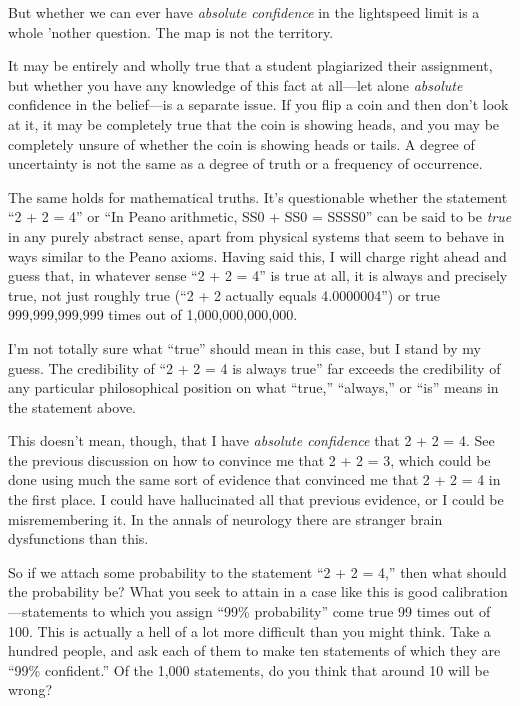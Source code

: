 {
 But whether we can ever have \textit{absolute confidence} in the
lightspeed limit is a whole 'nother question. The map
is not the territory.}

{
 It may be entirely and wholly true that a student plagiarized
their assignment, but whether you have any knowledge of this fact at
all---let alone \textit{absolute} confidence in the belief---is a
separate issue. If you flip a coin and then don't look
at it, it may be completely true that the coin is showing heads, and
you may be completely unsure of whether the coin is showing heads or
tails. A degree of uncertainty is not the same as a degree of truth or
a frequency of occurrence.}

{
 The same holds for mathematical truths. It's
questionable whether the statement ``2 + 2 =
4'' or ``In Peano arithmetic, SS0 +
SS0 = SSSS0'' can be said to be \textit{true} in any
purely abstract sense, apart from physical systems that seem to behave
in ways similar to the Peano axioms. Having said this, I will charge
right ahead and guess that, in whatever sense ``2 + 2
= 4'' is true at all, it is always and precisely
true, not just roughly true (``2 + 2 actually equals
4.0000004'') or true 999,999,999,999 times out of
1,000,000,000,000.}

{
 I'm not totally sure what
``true'' should mean in this case,
but I stand by my guess. The credibility of ``2 + 2 =
4 is always true'' far exceeds the credibility of any
particular philosophical position on what
``true,''
``always,'' or
``is'' means in the statement
above.}

{
 This doesn't mean, though, that I have
\textit{absolute confidence} that 2 + 2 = 4. See the previous
discussion on how to convince me that 2 + 2 = 3, which could be done
using much the same sort of evidence that convinced me that 2 + 2 = 4
in the first place. I could have hallucinated all that previous
evidence, or I could be misremembering it. In the annals of neurology
there are stranger brain dysfunctions than this.}

{
 So if we attach some probability to the statement
``2 + 2 = 4,'' then what should the
probability be? What you seek to attain in a case like this is good
calibration---statements to which you assign ``99\%
probability'' come true 99 times out of 100. This is
actually a hell of a lot more difficult than you might think. Take a
hundred people, and ask each of them to make ten statements of which
they are ``99\% confident.'' Of the
1,000 statements, do you think that around 10 will be wrong?}

